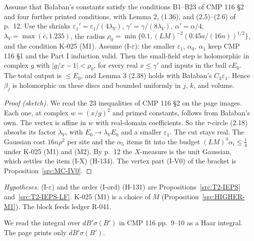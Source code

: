 \begin{proposition}\label{src:MC}
Assume that Ba{\l}aban's constants satisfy the conditions B1--B23 of CMP 116 \S2 and four further printed conditions, with Lemma 2, (1.36), and (2.5)--(2.6) of p.~12. Use the shrinks $\varepsilon_1'=\varepsilon_1/(4\lambda_V)$, $\gamma'=\gamma/(8\lambda_V)$, $\alpha'=\alpha/4$, $\lambda_V=\max(c,1.235)$, the radius $\rho_0=\min\{0.1,(LM)^{-2}(0.45a/(16n))^{1/2}\}$, and the condition K-025 (M1). Assume (I-$\varepsilon$): the smaller $\varepsilon_1$, $\alpha_0$, $\alpha_1$ keep CMP 116 \S1 and the Part I induction valid. Then the small-field step is holomorphic in complex $g$ with $|g/x-1|<\rho_0$, for every real $x\le\gamma'$ and inputs in the ball $cE_0$. The total output is $\le E_0$, and Lemma 3 (2.38) holds with Ba{\l}aban's $C_3\varepsilon_1$. Hence $\beta_j$ is holomorphic on these discs and bounded uniformly in $j$, $k$, and volume.
\end{proposition}
\begin{proof}[Proof (sketch)]
We read the 23 inequalities of CMP 116 \S2 on the page images. Each one, at complex $w=(x/g)^2$ and primed constants, follows from Ba{\l}aban's own. The vertex is affine in $w$ with real-domain coefficients. So the $\tau$-circle (2.18) absorbs its factor $\lambda_V$, with $E_0\to\lambda_VE_0$ and a smaller $\varepsilon_1$. The cut stays real. The Gaussian cost $16n\rho^2$ per site and the $\alpha_5$ items fit into the budget $(LM)^4\alpha_i\le\tfrac14$ under K-025 (M1) and (M2). By p.~12 the $X$-measure is the unit Gaussian, which settles the item (I-X) (H-134). The vertex part (I-V0) of the bracket is Proposition~\ref{src:MC-IV0}.
\end{proof}
\emph{Hypotheses.} (I-$\varepsilon$) and the order (I-ord) (H-131) are Propositions~\ref{src:T2-IEPS} and~\ref{src:T2-IEPS-LF}. K-025 (M1) is a choice of $M$ (Proposition~\ref{src:HIGHER-M1}). The block feeds ledger R-041.

\begin{convention}\label{conv:src-Haar}
We read the integral over $dB'\sigma(B')$ in CMP 116 pp.~9--10 as a Haar integral. The page prints only $dB'\sigma(B')$.
\end{convention}

